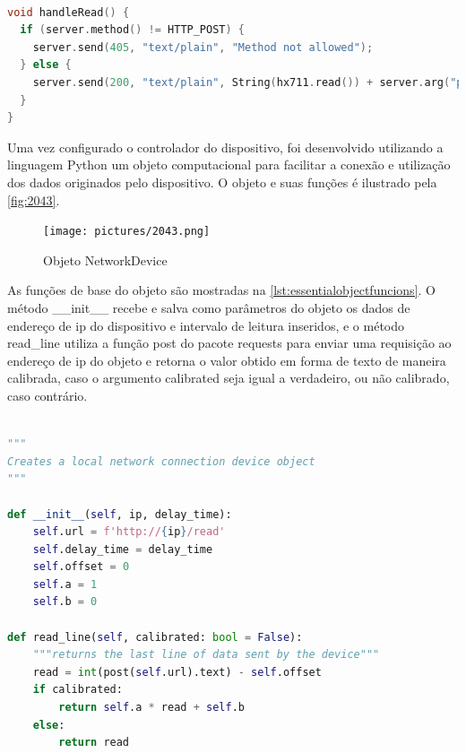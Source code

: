 \begin{lstlisting}[label={lst:handle_read},language=C++,caption={[Controller Program]{Função de obtenção de sinal pelo amplificador HX711}}]

void handleRead() {
  if (server.method() != HTTP_POST) {
    server.send(405, "text/plain", "Method not allowed");
  } else {
    server.send(200, "text/plain", String(hx711.read()) + server.arg("plain"));
  }
}

\end{lstlisting}

Uma vez configurado o controlador do dispositivo, foi desenvolvido utilizando a linguagem Python um objeto computacional para facilitar a conexão e utilização dos dados originados pelo dispositivo.
O objeto e suas funções é ilustrado pela \autoref{fig:2043}.

\begin{figure}[htb]
	\caption{\label{fig:2043} Objeto NetworkDevice}
	\begin{center}
		\texttt{[image: pictures/2043.png]}
	\end{center}
\end{figure}

As funções de base do objeto são mostradas na \autoref{lst:essentialobjectfuncions}.
O método \_\_init\_\_ recebe e salva como parâmetros do objeto os dados de endereço de ip do dispositivo e intervalo de leitura inseridos,
e o método read\_line utiliza a função post do pacote requests para enviar uma requisição ao endereço de ip do objeto e retorna o valor obtido em forma de
texto de maneira calibrada, caso o argumento calibrated seja igual a verdadeiro, ou não calibrado, caso contrário.

\begin{lstlisting}[label={lst:essentialobjectfuncions},language=Python,caption={[NetworkDevice]{Métodos base do objeto NetworkDevice}}]

"""
Creates a local network connection device object
"""

def __init__(self, ip, delay_time):
	self.url = f'http://{ip}/read'
	self.delay_time = delay_time
	self.offset = 0
	self.a = 1
	self.b = 0

def read_line(self, calibrated: bool = False):
	"""returns the last line of data sent by the device"""
	read = int(post(self.url).text) - self.offset
	if calibrated:
		return self.a * read + self.b
	else:
		return read

\end{lstlisting}

